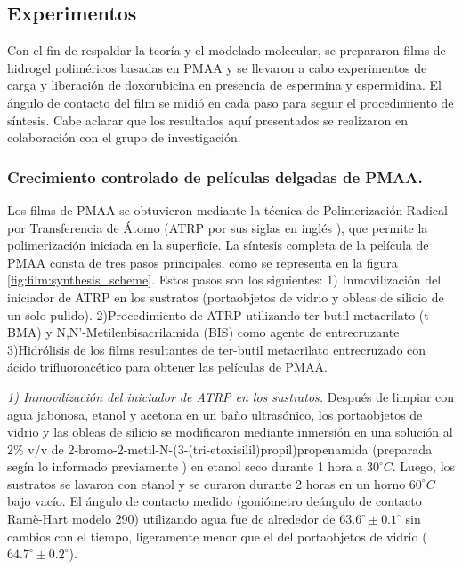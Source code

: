 \subsection{Experimentos}


Con el fin de respaldar la teor\'ia y el modelado molecular, se prepararon films de hidrogel polim\'ericos basadas en PMAA y se llevaron a cabo experimentos de carga y liberaci\'on de doxorubicina en presencia de espermina y espermidina. El \'angulo de contacto del film se midi\'o en cada paso para seguir el procedimiento de s\'intesis.
Cabe aclarar que los resultados aqu\'i presentados se realizaron en colaboraci\'on con el grupo de investigaci\'on.



\subsubsection{Crecimiento controlado de pel\'iculas delgadas de PMAA.}

Los films  de PMAA se obtuvieron mediante la t\'ecnica de Polimerizaci\'on Radical por Transferencia de \'Atomo (ATRP por sus siglas en ingl\'es ), que permite la polimerizaci\'on iniciada en la superficie.
La s\'intesis completa de la pel\'icula de PMAA consta de tres pasos principales, como se representa en la figura \ref{fig:film:synthesis_scheme}. Estos pasos son los siguientes:
1) Inmovilizaci\'on del iniciador de ATRP en los sustratos (portaobjetos de vidrio y obleas de silicio de un solo pulido).
2)Procedimiento de ATRP utilizando ter-butil metacrilato (t-BMA) y N,N'-Metilenbisacrilamida (BIS) como agente de entrecruzante
3)Hidr\'olisis de los films resultantes de ter-butil metacrilato entrecruzado con \'acido trifluoroac\'etico para obtener las pel\'iculas de PMAA.


\emph{1) Inmovilizaci\'on del iniciador de ATRP en los sustratos.}
 Despu\'es de limpiar con agua jabonosa, etanol y acetona en un ba\~no ultras\'onico, los portaobjetos de vidrio y las obleas de silicio se modificaron mediante inmersi\'on en una solución al 2\% v/v de 2-bromo-2-metil-N-(3-(tri-etoxisilil)propil)propenamida (preparada seg\'in lo informado previamente \cite{Yameen2008}) en etanol seco durante 1 hora a $30^\circ C$. Luego, los sustratos se lavaron con etanol y se curaron durante 2 horas en un horno $60^\circ C$ bajo vac\'io. El \'angulo de contacto medido (goni\'ometro de\'angulo de contacto Ramè-Hart modelo 290) utilizando agua fue de alrededor de $63.6^\circ \pm 0.1^\circ$ sin cambios con el tiempo, ligeramente menor que el del portaobjetos de vidrio ($64.7^\circ \pm 0.2^\circ$).%




